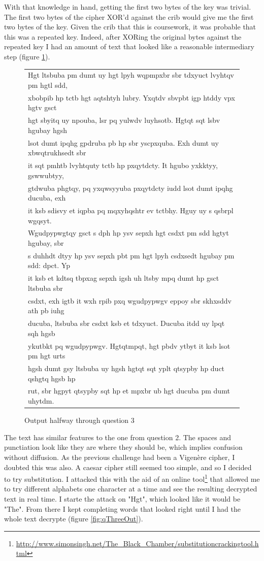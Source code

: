 \documentclass[12pt]{article}
\begin{document}
With that knowledge in hand, getting the first two bytes of the key was trivial. The first two bytes of the cipher XOR'd against the crib would give me the first two bytes of the key. Given the crib that this is coursework, it was probable that this was a repeated key. Indeed, after XORing the original bytes against the repeated key I had an amount of text that looked like a reasonable intermediary step (figure \ref{fig:intermediary}).

\begin{figure}[!h]
\label{fig:intermediary}
\begin{tabular}{|l|}
 \hline
Hgt ltsbuba pm dumt uy hgt lpyh wqpmpxbr sbr tdxyuct lvyhtqv pm hgtl sdd,\\ xbobpib hp tctb hgt aqtshtyh lubry. Yxqtdv sbvpbt igp htddy vpx hgtv gsct\\ hgt sbyitq uy npouba, lsr pq yulwdv luyhsotb. Hgtqt sqt lsbv hgubay hgsh\\ lsot dumt ipqhg gpdruba pb hp sbr yscpxquba. Exh dumt uy xbwqtrukhsedt sbr\\ it sqt pmhtb lvyhtquty tctb hp pxqytdcty. It hgubo yxkktyy, gswwubtyy,\\ gtdwuba phgtqy, pq yxqwsyyuba pxqytdcty iudd lsot dumt ipqhg ducuba, exh\\ it ksb sdisvy et iqpba pq mqxyhqshtr ev tctbhy. Hguy uy s qsbrpl wgqsyt.\\ Wgudpypwgtqy gsct s dph hp ysv sepxh hgt csdxt pm sdd hgtyt hgubay, sbr\\ s duhhdt dtyy hp ysv sepxh pbt pm hgt lpyh csdxsedt hgubay pm sdd: dpct. Yp\\ it ksb et kdtsq tbpxag sepxh igsh uh ltsby mpq dumt hp gsct ltsbuba sbr\\ csdxt, exh igtb it wxh rpib pxq wgudpypwgv eppoy sbr skhxsddv ath pb iuhg\\ ducuba, ltsbuba sbr csdxt ksb et tdxyuct. Ducuba itdd uy lpqt sqh hgsb \\ykutbkt pq wgudpypwgv. Hgtqtmpqt,  hgt pbdv ytbyt it ksb lsot pm hgt urts\\ hgsh dumt gsy ltsbuba uy hgsh hgtqt sqt yplt qtsypby hp duct qshgtq hgsb hp\\ rut, sbr hgpyt qtsypby sqt hp et mpxbr ub hgt ducuba pm dumt uhytdm.\\
\hline
\end{tabular}
\caption{Output halfway through question 3}
\end{figure}

The text has similar features to the one from question 2. The spaces and punctiation look like they are where they should be, which implies confusion without diffusion. As the previous challenge had been a Vigen\`ere cipher, I doubted this was also. A caesar cipher still seemed too simple, and so I decided to try substitution. I attacked this with the aid of an online tool\footnote{\url{http://www.simonsingh.net/The_Black_Chamber/substitutioncrackingtool.html}} that allowed me to try different alphabets one character at a time and see the resulting decrypted text in real time. I starte the attack on "Hgt", which looked like it would be "The". From there I kept completing words that looked right until I had the whole text decrypte (figure \ref{fig:qThreeOut}).
\end{document}
